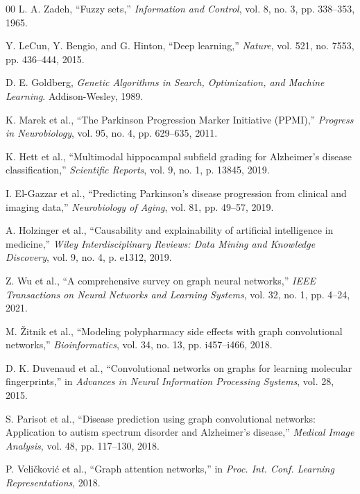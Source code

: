 \documentclass[journal,twoside,web]{ieeecolor}
\begin{document}
\begin{thebibliography}{00}
L. A. Zadeh, ``Fuzzy sets,'' \textit{Information and Control}, vol. 8, no. 3, pp. 338--353, 1965.

Y. LeCun, Y. Bengio, and G. Hinton, ``Deep learning,'' \textit{Nature}, vol. 521, no. 7553, pp. 436--444, 2015.

D. E. Goldberg, \textit{Genetic Algorithms in Search, Optimization, and Machine Learning}. Addison-Wesley, 1989.

K. Marek et al., ``The Parkinson Progression Marker Initiative (PPMI),'' \textit{Progress in Neurobiology}, vol. 95, no. 4, pp. 629--635, 2011.

K. Hett et al., ``Multimodal hippocampal subfield grading for Alzheimer's disease classification,'' \textit{Scientific Reports}, vol. 9, no. 1, p. 13845, 2019.

I. El-Gazzar et al., ``Predicting Parkinson's disease progression from clinical and imaging data,'' \textit{Neurobiology of Aging}, vol. 81, pp. 49--57, 2019.

A. Holzinger et al., ``Causability and explainability of artificial intelligence in medicine,'' \textit{Wiley Interdisciplinary Reviews: Data Mining and Knowledge Discovery}, vol. 9, no. 4, p. e1312, 2019.

Z. Wu et al., ``A comprehensive survey on graph neural networks,'' \textit{IEEE Transactions on Neural Networks and Learning Systems}, vol. 32, no. 1, pp. 4--24, 2021.

M. \v{Z}itnik et al., ``Modeling polypharmacy side effects with graph convolutional networks,'' \textit{Bioinformatics}, vol. 34, no. 13, pp. i457--i466, 2018.

D. K. Duvenaud et al., ``Convolutional networks on graphs for learning molecular fingerprints,'' in \textit{Advances in Neural Information Processing Systems}, vol. 28, 2015.

S. Parisot et al., ``Disease prediction using graph convolutional networks: Application to autism spectrum disorder and Alzheimer's disease,'' \textit{Medical Image Analysis}, vol. 48, pp. 117--130, 2018.

P. Veli\v{c}kovi\'{c} et al., ``Graph attention networks,'' in \textit{Proc. Int. Conf. Learning Representations}, 2018.


\end{thebibliography}
\end{document}

